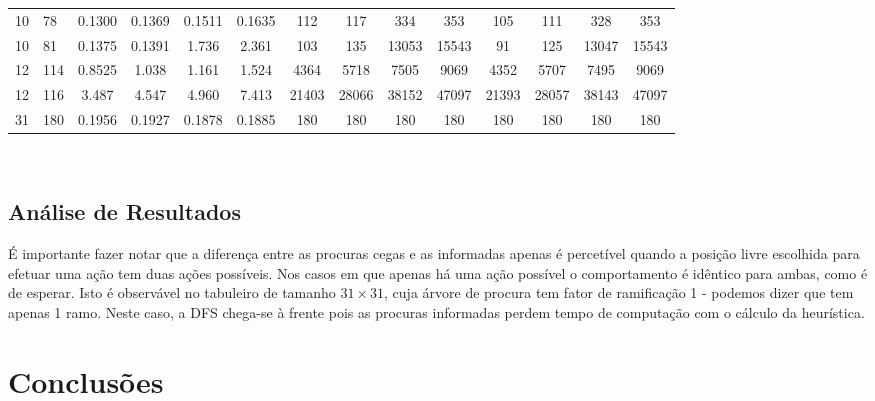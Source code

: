 \documentclass[12pt,a4paper]{article}
\begin{document}
\begin{adjustbox}{width={\textwidth}, totalheight={\textheight}, keepaspectratio}
\begin{tabular}{ll cccc cccc cccc}
    10                        & 78                                        & 0.1300                          & 0.1369                             & 0.1511 & 0.1635 & 112   & 117   & 334   & 353   & 105   & 111   & 328   & 353   \\
    10                        & 81                                        & 0.1375                          & 0.1391                             & 1.736  & 2.361  & 103   & 135   & 13053 & 15543 & 91    & 125   & 13047 & 15543 \\
    12                        & 114                                       & 0.8525                          & 1.038                              & 1.161  & 1.524  & 4364  & 5718  & 7505  & 9069  & 4352  & 5707  & 7495  & 9069  \\
    12                        & 116                                       & 3.487                           & 4.547                              & 4.960  & 7.413  & 21403 & 28066 & 38152 & 47097 & 21393 & 28057 & 38143 & 47097 \\
    31                        & 180                                       & 0.1956                          & 0.1927                             & 0.1878 & 0.1885 & 180   & 180   & 180   & 180   & 180   & 180   & 180   & 180   \\
    \bottomrule
  \end{tabular}
\end{adjustbox} \\

\subsection{Análise de Resultados}

É importante fazer notar que a diferença entre as procuras cegas e as informadas
apenas é percetível quando a posição livre escolhida para efetuar uma ação tem duas ações possíveis.
Nos casos em que apenas há uma ação possível o comportamento é idêntico para ambas, como é de esperar.
Isto é observável no tabuleiro de tamanho \(31 \times 31\), cuja árvore de procura tem fator de ramificação 1 -
podemos dizer que tem apenas 1 ramo. Neste caso, a DFS chega-se à frente pois as procuras informadas perdem
tempo de computação com o cálculo da heurística.

\section{Conclusões}
\end{document}
